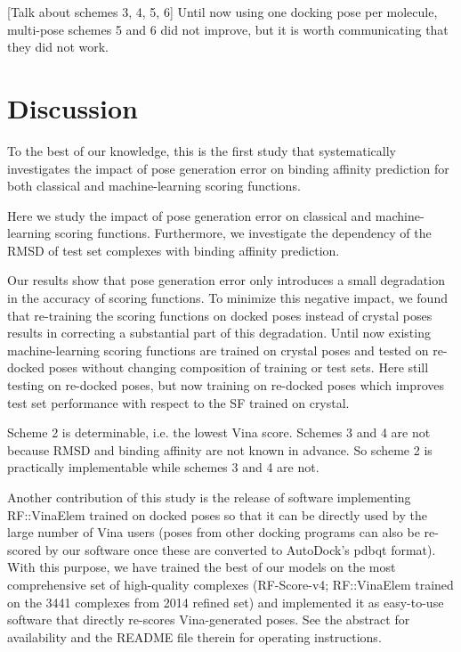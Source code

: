 \documentclass[twocolumn]{bmcart}
\begin{document}
[Talk about schemes 3, 4, 5, 6] Until now using one docking pose per molecule, multi-pose schemes 5 and 6 did not improve, but it is worth communicating that they did not work.

\section*{Discussion}

To the best of our knowledge, this is the first study that systematically investigates the impact of pose generation error on binding affinity prediction for both classical and machine-learning scoring functions.

Here we study the impact of pose generation error on classical and machine-learning scoring functions. Furthermore, we investigate the dependency of the RMSD of test set complexes with binding affinity prediction. %

Our results show that pose generation error only introduces a small degradation in the accuracy of scoring functions. To minimize this negative impact, we found that re-training the scoring functions on docked poses instead of crystal poses results in correcting a substantial part of this degradation. Until now existing machine-learning scoring functions are trained on crystal poses and tested on re-docked poses without changing composition of training or test sets. Here still testing on re-docked poses, but now training on re-docked poses which improves test set performance with respect to the SF trained on crystal.

Scheme 2 is determinable, i.e. the lowest Vina score. Schemes 3 and 4 are not because RMSD and binding affinity are not known in advance. So scheme 2 is practically implementable while schemes 3 and 4 are not.

Another contribution of this study is the release of software implementing RF::VinaElem trained on docked poses so that it can be directly used by the large number of Vina users (poses from other docking programs can also be re-scored by our software once these are converted to AutoDock’s pdbqt format). With this purpose, we have trained the best of our models on the most comprehensive set of high-quality complexes (RF-Score-v4; RF::VinaElem trained on the 3441 complexes from 2014 refined set) and implemented it as easy-to-use software that directly re-scores Vina-generated poses. See the abstract for availability and the README file therein for operating instructions.
\end{document}
